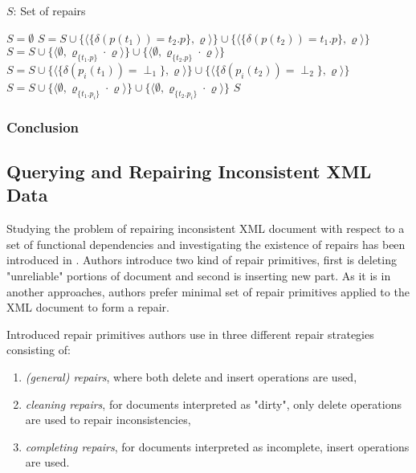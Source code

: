 \begin{algorithm}[H]
\caption{$computeRepairs(F, t_1, t_2, RXT)$}
\begin{algorithmic}[1]
\ENSURE $S$: Set of repairs

\STATE $S = \emptyset$
	\STATE $S = S \cup \{\langle \{\delta(p(t_1)) = t_2.p\}, \varrho \rangle\} \cup \{\langle \{\delta(p(t_2)) = t_1.p\}, \varrho \rangle\} $
\ELSE
	\STATE $S = S \cup \{\langle \emptyset, \varrho_{\{t_1.p\}} \cdot \varrho \rangle\} \cup \{\langle \emptyset, \varrho_{\{t_2.p\}} \cdot \varrho \rangle\}$
\ENDIF
{}
		\STATE $S = S \cup \{\langle \{\delta(p_i(t_1)) = \perp_1\}, \varrho \rangle\} \cup \{\langle \{\delta(p_i(t_2)) = \perp_2\}, \varrho \rangle\}$
	\ELSE
		\STATE $S = S \cup \{\langle \emptyset, \varrho_{\{t_1.p_i\}} \cdot \varrho \rangle\} \cup \{\langle \emptyset, \varrho_{\{t_2.p_i\}} \cdot \varrho \rangle\}$
	\ENDIF
\ENDFOR
\RETURN $S$
\end{algorithmic}
\end{algorithm}

\subsubsection{Conclusion}


\subsection{Querying and Repairing Inconsistent XML Data}

Studying the problem of repairing inconsistent XML document with respect to a set of functional dependencies and investigating the existence of repairs has been introduced in \cite{QueryXML}. Authors introduce two kind of repair primitives, first is deleting "unreliable" portions of document and second is inserting new part. As it is in another approaches, authors prefer minimal set of repair primitives applied to the XML document to form a repair.

Introduced repair primitives authors use in three different repair strategies consisting of:
\begin{enumerate}
	\item \textit{(general) repairs}, where both delete and insert operations are used,
	\item \textit{cleaning repairs}, for documents interpreted as "dirty", only delete operations are used to repair inconsistencies,
	\item \textit{completing repairs}, for documents interpreted as incomplete, insert operations are used.
\end{enumerate}

